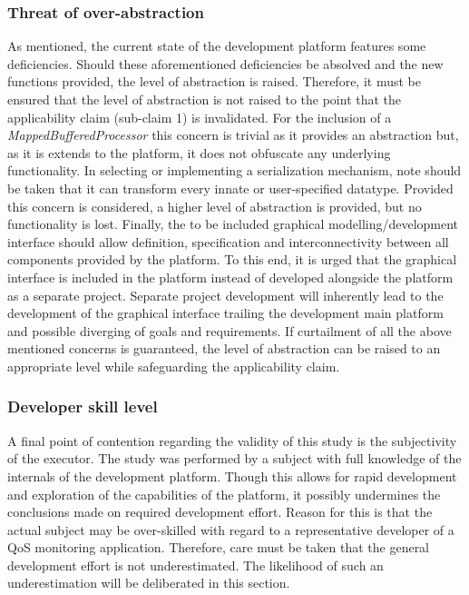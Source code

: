 \subsubsection{Threat of over-abstraction}
As mentioned, the current state of the development platform features some deficiencies. Should these aforementioned deficiencies be absolved and the new functions provided, the level of abstraction is raised. Therefore, it must be ensured that the level of abstraction is not raised to the point that the applicability claim (sub-claim 1) is invalidated. For the inclusion of a \emph{MappedBufferedProcessor} this concern is trivial as it provides an abstraction but, as it is extends to the platform, it does not obfuscate any underlying functionality. In selecting or implementing a serialization mechanism, note should be taken that it can transform every innate or user-specified datatype. Provided this concern is considered, a higher level of abstraction is provided, but no functionality is lost. Finally, the to be included graphical modelling/development interface should allow definition, specification and interconnectivity between all components provided by the platform. To this end, it is urged that the graphical interface is included in the platform instead of developed alongside the platform as a separate project. Separate project development will inherently lead to the development of the graphical interface trailing the development main platform and possible diverging of goals and requirements. If curtailment of all the above mentioned concerns is guaranteed, the level of abstraction can be raised to an appropriate level while safeguarding the applicability claim.

\subsubsection{Developer skill level}
A final point of contention regarding the validity of this study is the subjectivity of the executor. The study was performed by a subject with full knowledge of the internals of the development platform. Though this allows for rapid development and exploration of the capabilities of the platform, it possibly undermines the conclusions made on required development effort. Reason for this is that the actual subject may be over-skilled with regard to a representative developer of a QoS monitoring application. Therefore, care must be taken that the general development effort is not underestimated. The likelihood of such an underestimation will be deliberated in this section.

